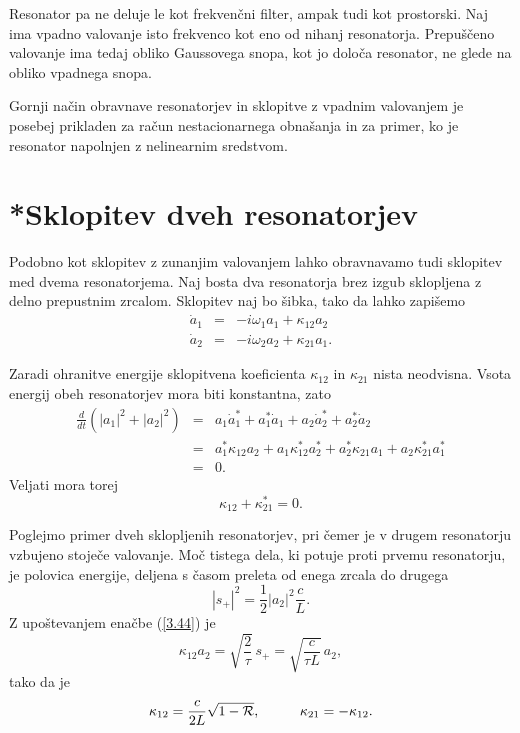Resonator pa ne deluje le kot frekvenčni filter, ampak tudi
kot prostorski. Naj ima vpadno valovanje isto frekvenco kot
eno od nihanj resonatorja. Prepuščeno valovanje ima tedaj obliko
Gaussovega snopa, kot jo določa resonator, ne glede na obliko vpadnega
snopa.

Gornji način obravnave resonatorjev in sklopitve z vpadnim valovanjem
je posebej prikladen za račun nestacionarnega obnašanja in za primer,
ko je resonator napolnjen z nelinearnim sredstvom.

\section{*Sklopitev dveh resonatorjev}
Podobno kot sklopitev z zunanjim valovanjem lahko obravnavamo tudi
sklopitev med dvema resonatorjema. Naj bosta dva resonatorja brez izgub
sklopljena z delno prepustnim zrcalom. Sklopitev naj bo šibka, tako da lahko zapišemo 
\begin{eqnarray}
\dot{a}_{1} & = & -i\omega_{1}a_{1}+\kappa_{12}a_{2} \\
\dot{a}_{2} & = & -i\omega_{2}a_{2}+\kappa_{21}a_{1}.
\end{eqnarray}

Zaradi ohranitve energije sklopitvena koeficienta $\kappa_{12}$ in
$\kappa_{21}$ nista neodvisna. Vsota energij obeh resonatorjev mora
biti konstantna, zato 
\begin{eqnarray}
\frac{d}{dt}(|a_{1}|^{2}+|a_{2}|^{2}) & = & a_{1}\dot{a}_{1}^{*}+a_{1}^{*}\dot{a}_{1}+
a_{2}\dot{a}_{2}^{*}+a_{2}^{*}\dot{a}_{2}\nonumber \\
 & = & a_{1}^{*}\kappa_{12}a_{2}+a_{1}\kappa_{12}^{*}a_{2}^{*}+a_{2}^{*}\kappa_{21}a_{1}+
 a_{2}\kappa_{21}^{*}a_{1}^{*}\nonumber \\
 & = & 0.
\end{eqnarray}
Veljati mora torej
\begin{equation}
\kappa_{12}+\kappa_{21}^{*}=0.
\label{3.56}
\end{equation}

Poglejmo primer dveh sklopljenih resonatorjev, pri čemer je v drugem resonatorju vzbujeno 
stoječe valovanje. Moč tistega dela, ki potuje proti prvemu resonatorju,
je polovica energije, deljena s časom preleta od enega zrcala do drugega
\begin{equation}
|s_{+}|^{2}=\frac{1}{2}|a_{2}|^{2}\frac{c}{L}.
\label{3.57}
\end{equation}
 Z upoštevanjem enačbe (\ref{3.44}) je 
\begin{equation}
\kappa_{12}a_{2}=\sqrt{\frac{2}{\tau}}\, s_{+}=\sqrt{\frac{c}{\tau L}}\, a_{2},
\label{3.58}
\end{equation}
 tako da je 
\begin{equation}
\kappa_{12}=\frac{c}{2L}\sqrt{1-{\cal R}},\mbox{\hskip1cm}\kappa_{21}=-\kappa_{12}.
\label{3.59}
\end{equation}

